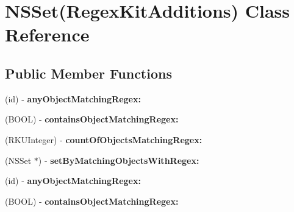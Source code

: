 \hypertarget{interface_n_s_set_07_regex_kit_additions_08}{\section{N\-S\-Set(Regex\-Kit\-Additions) Class Reference}
\label{interface_n_s_set_07_regex_kit_additions_08}
}
\subsection*{Public Member Functions}
\begin{DoxyCompactItemize}
\item 
\hypertarget{interface_n_s_set_07_regex_kit_additions_08_a929e3183be26c153d0b4af22c173271f}{(id) -\/ {\bfseries any\-Object\-Matching\-Regex\-:}}\label{interface_n_s_set_07_regex_kit_additions_08_a929e3183be26c153d0b4af22c173271f}

\item 
\hypertarget{interface_n_s_set_07_regex_kit_additions_08_a5927c0c9f06e8f0db2de06f6c0fb7fd7}{(B\-O\-O\-L) -\/ {\bfseries contains\-Object\-Matching\-Regex\-:}}\label{interface_n_s_set_07_regex_kit_additions_08_a5927c0c9f06e8f0db2de06f6c0fb7fd7}

\item 
\hypertarget{interface_n_s_set_07_regex_kit_additions_08_a56f47b1db7afab9d9036eb9788111fa5}{(R\-K\-U\-Integer) -\/ {\bfseries count\-Of\-Objects\-Matching\-Regex\-:}}\label{interface_n_s_set_07_regex_kit_additions_08_a56f47b1db7afab9d9036eb9788111fa5}

\item 
\hypertarget{interface_n_s_set_07_regex_kit_additions_08_aefe34f81e6ff55ec40c1b8ecab4fdc20}{(N\-S\-Set $\ast$) -\/ {\bfseries set\-By\-Matching\-Objects\-With\-Regex\-:}}\label{interface_n_s_set_07_regex_kit_additions_08_aefe34f81e6ff55ec40c1b8ecab4fdc20}

\item 
\hypertarget{interface_n_s_set_07_regex_kit_additions_08_a929e3183be26c153d0b4af22c173271f}{(id) -\/ {\bfseries any\-Object\-Matching\-Regex\-:}}\label{interface_n_s_set_07_regex_kit_additions_08_a929e3183be26c153d0b4af22c173271f}

\item 
\hypertarget{interface_n_s_set_07_regex_kit_additions_08_a5927c0c9f06e8f0db2de06f6c0fb7fd7}{(B\-O\-O\-L) -\/ {\bfseries contains\-Object\-Matching\-Regex\-:}}\label{interface_n_s_set_07_regex_kit_additions_08_a5927c0c9f06e8f0db2de06f6c0fb7fd7}


\end{DoxyCompactItemize}
